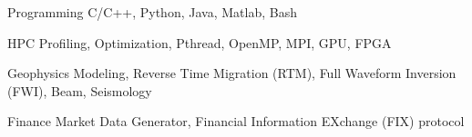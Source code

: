 \documentclass[11pt, a4paper]{awesome-cv}
\begin{document}
\begin{cvskills}

  \cvskill
    {Programming} %
    {C/C++, Python, Java, Matlab, Bash} %

  \cvskill
    {HPC} %
    {Profiling, Optimization, Pthread, OpenMP, MPI, GPU, FPGA} %

  \cvskill
    {Geophysics} %
    {Modeling, Reverse Time Migration (RTM), Full Waveform Inversion (FWI), Beam, Seismology} %
    
  \cvskill
    {Finance} %
    {Market Data Generator, Financial Information EXchange (FIX) protocol} %

\end{cvskills}




\end{document}
